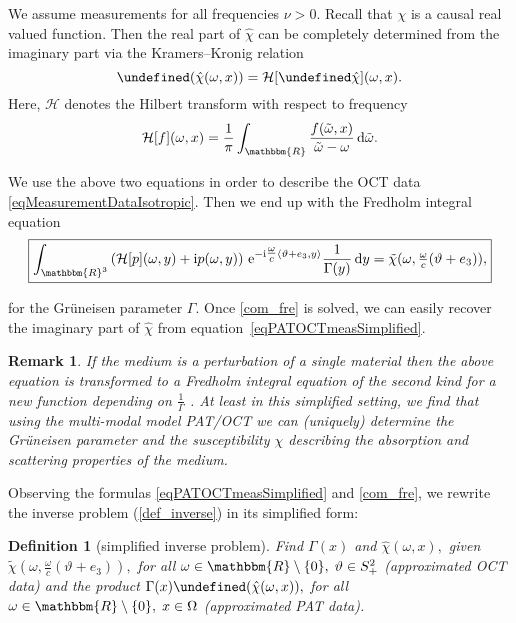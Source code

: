 \documentclass[a4paper,twoside,10pt]{article}
\theoremstyle{break}
\newtheorem{definition}[definition]{Definition}
\newtheorem{remark}[remark]{Remark}
\theoremstyle{nonumberplain}
\newcommand{\R}{\mathbbm{R}}
\newcommand{\e}{\mathrm e}
\renewcommand{\i}{\mathrm i}
\renewcommand{\d}{\,\mathrm d}
\let\RE\Re
\let\Re=\undefined
\DeclareMathOperator{\Re}{\RE e}
\let\IM\Im
\let\Im=\undefined
\DeclareMathOperator{\Im}{\IM m}
\begin{document}
We assume measurements for all frequencies $\nu>0.$ Recall that $\chi$ is a causal real valued function. Then the real part of $\hat\chi$ can be completely determined from the imaginary part via the Kramers--Kronig relation
\begin{equation*}
\Re(\hat\chi (\omega,x)) = \mathcal{H}[\Im \hat\chi ] (\omega,x) .
\end{equation*}
Here, $\mathcal{H}$ denotes the Hilbert transform with respect to frequency
\[
\mathcal{H}[ f] (\omega ,x ) = \frac{1}{\pi} \int_{\R} \frac{ f(\tilde{\omega},x)}{\tilde{\omega}-\omega} \d \tilde{\omega}.
\]

We use the above two equations in order to describe the OCT data \eqref{eqMeasurementDataIsotropic}. Then we end up with the Fredholm integral equation
\begin{equation}\label{com_fre}
\boxed{\int_{\R^3} \left(\mathcal{H} [p] (\omega , y) + \i p (\omega , y) \right) \, \e^{-\i \tfrac{\omega}c \langle \vartheta + e_3,  y\rangle} \frac1{\Gamma (y)} \d y =   \tilde\chi (\omega,\tfrac\omega c(\vartheta+e_3)) ,}
\end{equation}

for the Gr\"uneisen parameter $\Gamma.$ Once \eqref{com_fre} is solved, we can easily recover the imaginary part of $\hat\chi$ from equation~\eqref{eqPATOCTmeasSimplified}. 

\begin{remark} If the medium is a perturbation of a single material then the above equation is transformed to a Fredholm integral equation of the second kind for a new function depending on $\tfrac1\Gamma$ \cite{ElbMinSch17}. At least in this simplified setting, we find that using the multi-modal model PAT/OCT we can (uniquely) determine the Gr\"uneisen parameter and the susceptibility $\chi$ describing the absorption and scattering properties of the medium.
\end{remark}

Observing the formulas \eqref{eqPATOCTmeasSimplified} and \eqref{com_fre}, we rewrite the inverse problem (\autoref{def_inverse}) in its simplified form:

\begin{definition}[simplified inverse problem]
 Find $\Gamma (x)$ and $\hat \chi (\omega,x),$ given $\tilde\chi (\omega,\tfrac\omega c(\vartheta+e_3)),$ for all $\omega\in\R\setminus\{0\},\;\vartheta\in S^2_+ $ (approximated OCT data) and the product $\Gamma (x) \Im(\hat\chi(\omega,x)),$ for all $\omega\in\R\setminus\{0\},\;x\in \Omega$ (approximated PAT data).
\end{definition}
\end{document}
